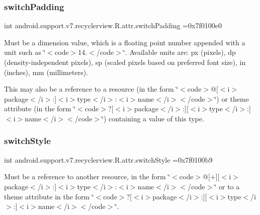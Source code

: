 \subsubsection{\texorpdfstring{switch\+Padding}{switchPadding}}
{\footnotesize\ttfamily int android.\+support.\+v7.\+recyclerview.\+R.\+attr.\+switch\+Padding =0x7f0100e0\hspace{0.3cm}{\ttfamily [static]}}

Must be a dimension value, which is a floating point number appended with a unit such as \char`\"{}$<$code$>$14.\+5sp$<$/code$>$\char`\"{}. Available units are\+: px (pixels), dp (density-\/independent pixels), sp (scaled pixels based on preferred font size), in (inches), mm (millimeters). 

This may also be a reference to a resource (in the form \char`\"{}$<$code$>$@\mbox{[}$<$i$>$package$<$/i$>$\+:\mbox{]}$<$i$>$type$<$/i$>$\+:$<$i$>$name$<$/i$>$$<$/code$>$\char`\"{}) or theme attribute (in the form \char`\"{}$<$code$>$?\mbox{[}$<$i$>$package$<$/i$>$\+:\mbox{]}\mbox{[}$<$i$>$type$<$/i$>$\+:\mbox{]}$<$i$>$name$<$/i$>$$<$/code$>$\char`\"{}) containing a value of this type. \mbox{\label{classandroid_1_1support_1_1v7_1_1recyclerview_1_1R_1_1attr_a894c96a3e537952f426b821e0fd073b4}} 
\subsubsection{\texorpdfstring{switch\+Style}{switchStyle}}
{\footnotesize\ttfamily int android.\+support.\+v7.\+recyclerview.\+R.\+attr.\+switch\+Style =0x7f0100b9\hspace{0.3cm}{\ttfamily [static]}}

Must be a reference to another resource, in the form \char`\"{}$<$code$>$@\mbox{[}+\mbox{]}\mbox{[}$<$i$>$package$<$/i$>$\+:\mbox{]}$<$i$>$type$<$/i$>$\+:$<$i$>$name$<$/i$>$$<$/code$>$\char`\"{} or to a theme attribute in the form \char`\"{}$<$code$>$?\mbox{[}$<$i$>$package$<$/i$>$\+:\mbox{]}\mbox{[}$<$i$>$type$<$/i$>$\+:\mbox{]}$<$i$>$name$<$/i$>$$<$/code$>$\char`\"{}. \mbox{\label{classandroid_1_1support_1_1v7_1_1recyclerview_1_1R_1_1attr_a0c5fb51c05b4bed3f21785508b70137a}} 
